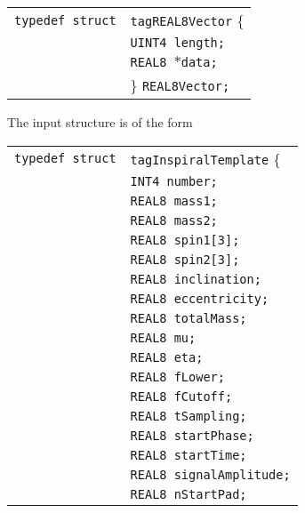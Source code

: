 \documentclass[12pt]{article}
\begin{document}
\begin{tabular}{ll}
\texttt{typedef struct} & \texttt{tagREAL8Vector} \{ \\
                        & \texttt{UINT4 length;} \\
                        & \texttt{REAL8 $\ast$data;}  \\
                        & \} \texttt{REAL8Vector;}
\end{tabular}

\vspace{5mm}

\vspace{5mm}


The input structure is of the form

\vspace{5mm}

\begin{tabular}{ll}
\texttt{typedef struct} & \texttt{tagInspiralTemplate} \{ \\
                        & \texttt{INT4 number;} \\
                        & \texttt{REAL8 mass1;} \\
                        & \texttt{REAL8 mass2;}  \\
                        & \texttt{REAL8 spin1[3];}  \\
                        & \texttt{REAL8 spin2[3];}  \\
                        & \texttt{REAL8 inclination;} \\
                        & \texttt{REAL8 eccentricity;} \\
                        & \texttt{REAL8 totalMass;} \\
                        & \texttt{REAL8 mu;}  \\
                        & \texttt{REAL8 eta;}  \\
                        & \texttt{REAL8 fLower;}  \\
                        & \texttt{REAL8 fCutoff;} \\
                        & \texttt{REAL8 tSampling;} \\
                        & \texttt{REAL8 startPhase;} \\
                        & \texttt{REAL8 startTime;} \\
                        & \texttt{REAL8 signalAmplitude;} \\
                        & \texttt{REAL8 nStartPad;} \\

\end{tabular}
\end{document}
